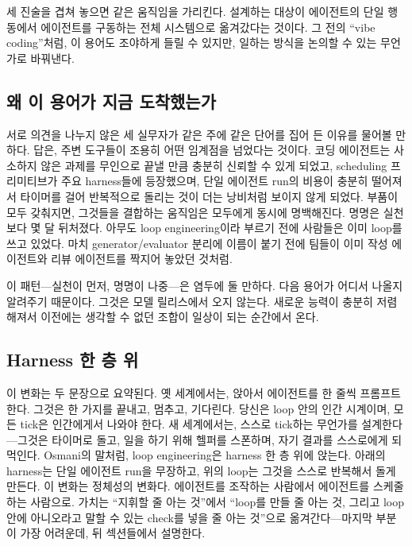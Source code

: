 \documentclass[conference]{IEEEtran}
\begin{document}
세 진술을 겹쳐 놓으면 같은 움직임을 가리킨다. 설계하는 대상이 에이전트의 단일 행동에서 에이전트를 구동하는 전체 시스템으로 옮겨갔다는 것이다. 그 전의 ``vibe coding''처럼, 이 용어도 조야하게 들릴 수 있지만, 일하는 방식을 논의할 수 있는 무언가로 바꿔낸다.

\subsection{왜 이 용어가 지금 도착했는가}
서로 의견을 나누지 않은 세 실무자가 같은 주에 같은 단어를 집어 든 이유를 물어볼 만하다. 답은, 주변 도구들이 조용히 어떤 임계점을 넘었다는 것이다. 코딩 에이전트는 사소하지 않은 과제를 무인으로 끝낼 만큼 충분히 신뢰할 수 있게 되었고, scheduling 프리미티브가 주요 harness들에 등장했으며, 단일 에이전트 run의 비용이 충분히 떨어져서 타이머를 걸어 반복적으로 돌리는 것이 더는 낭비처럼 보이지 않게 되었다. 부품이 모두 갖춰지면, 그것들을 결합하는 움직임은 모두에게 동시에 명백해진다. 명명은 실천보다 몇 달 뒤처졌다. 아무도 loop engineering이라 부르기 전에 사람들은 이미 loop를 쓰고 있었다. 마치 generator/evaluator 분리에 이름이 붙기 전에 팀들이 이미 작성 에이전트와 리뷰 에이전트를 짝지어 놓았던 것처럼.

이 패턴---실천이 먼저, 명명이 나중---은 염두에 둘 만하다. 다음 용어가 어디서 나올지 알려주기 때문이다. 그것은 모델 릴리스에서 오지 않는다. 새로운 능력이 충분히 저렴해져서 이전에는 생각할 수 없던 조합이 일상이 되는 순간에서 온다.

\subsection{Harness 한 층 위}
이 변화는 두 문장으로 요약된다. 옛 세계에서는, 앉아서 에이전트를 한 줄씩 프롬프트한다. 그것은 한 가지를 끝내고, 멈추고, 기다린다. 당신은 loop 안의 인간 시계이며, 모든 tick은 인간에게서 나와야 한다. 새 세계에서는, 스스로 tick하는 무언가를 설계한다---그것은 타이머로 돌고, 일을 하기 위해 헬퍼를 스폰하며, 자기 결과를 스스로에게 되먹인다. Osmani의 말처럼, loop engineering은 harness 한 층 위에 앉는다. 아래의 harness는 단일 에이전트 run을 무장하고, 위의 loop는 그것을 스스로 반복해서 돌게 만든다. 이 변화는 정체성의 변화다. 에이전트를 조작하는 사람에서 에이전트를 스케줄하는 사람으로. 가치는 ``지휘할 줄 아는 것''에서 ``loop를 만들 줄 아는 것, 그리고 loop 안에 아니오라고 말할 수 있는 check를 넣을 줄 아는 것''으로 옮겨간다---마지막 부분이 가장 어려운데, 뒤 섹션들에서 설명한다.
\end{document}
